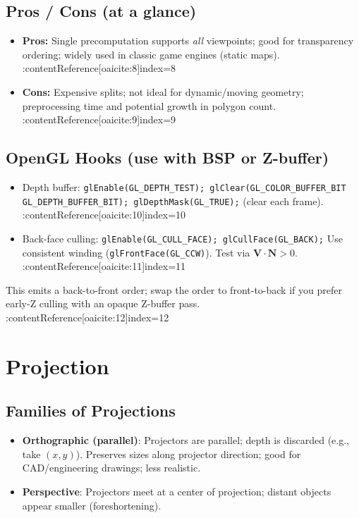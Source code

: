 \documentclass[8pt,twocolumn]{extarticle}
\begin{document}
\subsection*{Pros / Cons (at a glance)}
\begin{itemize}
  \item \textbf{Pros:} Single precomputation supports \emph{all} viewpoints; good for transparency ordering; widely used in classic game engines (static maps). :contentReference[oaicite:8]{index=8}
  \item \textbf{Cons:} Expensive splits; not ideal for dynamic/moving geometry; preprocessing time and potential growth in polygon count. :contentReference[oaicite:9]{index=9}
\end{itemize}

\subsection*{OpenGL Hooks (use with BSP or Z-buffer)}
\begin{itemize}
  \item Depth buffer: \verb|glEnable(GL_DEPTH_TEST); glClear(GL_COLOR_BUFFER_BIT| \verb| GL_DEPTH_BUFFER_BIT); glDepthMask(GL_TRUE);| (clear each frame). :contentReference[oaicite:10]{index=10}
  \item Back-face culling: \verb|glEnable(GL_CULL_FACE); glCullFace(GL_BACK);| Use consistent winding (\verb|glFrontFace(GL_CCW)|). Test via $\mathbf{V}\cdot\mathbf{N}>0$. :contentReference[oaicite:11]{index=11}
\end{itemize}

This emits a back-to-front order; swap the order to front-to-back if you prefer early-Z culling with an opaque Z-buffer pass. :contentReference[oaicite:12]{index=12}


\section{Projection}

\subsection*{Families of Projections}
\begin{itemize}
  \item \textbf{Orthographic (parallel)}: Projectors are parallel; depth is discarded (e.g., take \((x,y)\)). Preserves sizes along projector direction; good for CAD/engineering drawings; less realistic.
  \item \textbf{Perspective}: Projectors meet at a center of projection; distant objects appear smaller (foreshortening).
\end{itemize}
\end{document}
